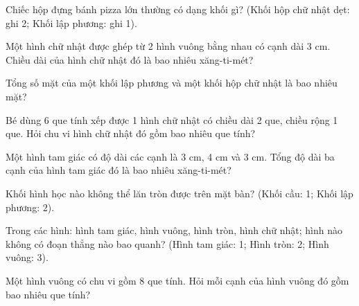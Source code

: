 \begin{ex}
Chiếc hộp đựng bánh pizza lớn thường có dạng khối gì? (Khối hộp chữ nhật dẹt: ghi 2; Khối lập phương: ghi 1).
\end{ex}

\begin{ex}
Một hình chữ nhật được ghép từ 2 hình vuông bằng nhau có cạnh dài 3 cm. Chiều dài của hình chữ nhật đó là bao nhiêu xăng-ti-mét?
\end{ex}

\begin{ex}
Tổng số mặt của một khối lập phương và một khối hộp chữ nhật là bao nhiêu mặt?
\end{ex}

\begin{ex}
Bé dùng 6 que tính xếp được 1 hình chữ nhật có chiều dài 2 que, chiều rộng 1 que. Hỏi chu vi hình chữ nhật đó gồm bao nhiêu que tính?
\end{ex}

\begin{ex}
Một hình tam giác có độ dài các cạnh là 3 cm, 4 cm và 3 cm. Tổng độ dài ba cạnh của hình tam giác đó là bao nhiêu xăng-ti-mét?
\end{ex}

\begin{ex}
Khối hình học nào không thể lăn tròn được trên mặt bàn? (Khối cầu: 1; Khối lập phương: 2).
\end{ex}

\begin{ex}
Trong các hình: hình tam giác, hình vuông, hình tròn, hình chữ nhật; hình nào không có đoạn thẳng nào bao quanh? (Hình tam giác: 1; Hình tròn: 2; Hình vuông: 3).
\end{ex}

\begin{ex}
Một hình vuông có chu vi gồm 8 que tính. Hỏi mỗi cạnh của hình vuông đó gồm bao nhiêu que tính?
\end{ex}
